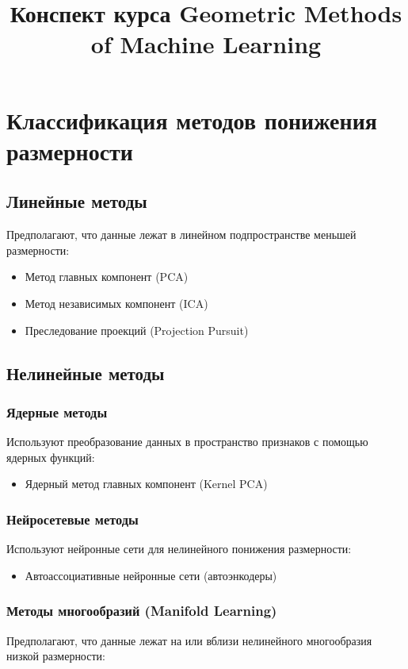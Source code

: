 \documentclass[a4paper,12pt]{article}
\title{Конспект курса Geometric Methods of Machine Learning}
\author{}
\date{}
\begin{document}
\maketitle
\tableofcontents


\section{Классификация методов понижения размерности}

\subsection{Линейные методы}
Предполагают, что данные лежат в линейном подпространстве меньшей размерности:
\begin{itemize}
    \item Метод главных компонент (PCA)
    \item Метод независимых компонент (ICA)
    \item Преследование проекций (Projection Pursuit)
\end{itemize}

\subsection{Нелинейные методы}

\subsubsection{Ядерные методы}
Используют преобразование данных в пространство признаков с помощью ядерных функций:
\begin{itemize}
    \item Ядерный метод главных компонент (Kernel PCA)
\end{itemize}

\subsubsection{Нейросетевые методы}
Используют нейронные сети для нелинейного понижения размерности:
\begin{itemize}
    \item Автоассоциативные нейронные сети (автоэнкодеры)
\end{itemize}

\subsubsection{Методы многообразий (Manifold Learning)}
Предполагают, что данные лежат на или вблизи нелинейного многообразия низкой размерности:
\end{document}
